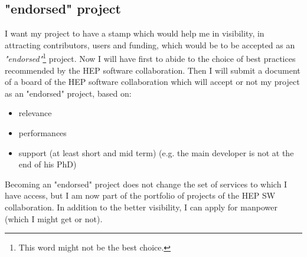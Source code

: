 \documentclass[11pt]{article} %
\begin{document}
\subsection{"endorsed" project }
I want my project to have a stamp which would help me in visibility, in attracting contributors, users and funding, which would be to be accepted as an {\em "endorsed"}\footnote{This word might not be the best choice.} project.
Now I will have first to abide to the choice of best practices recommended by the HEP software collaboration. Then I will submit a document of a board of the HEP software collaboration which will accept or not my project as an "endorsed" project, based on:
\begin{itemize}
\item relevance
\item performances 
\item support (at least short and mid term) (e.g. the main developer is not at the end of his PhD) 
\end{itemize}

Becoming an "endorsed" project does not change the set of services to which I have access, but I am now part of the portfolio of projects of the HEP SW collaboration. In addition to the better visibility, I can apply for manpower (which I might get or not).
\end{document}
